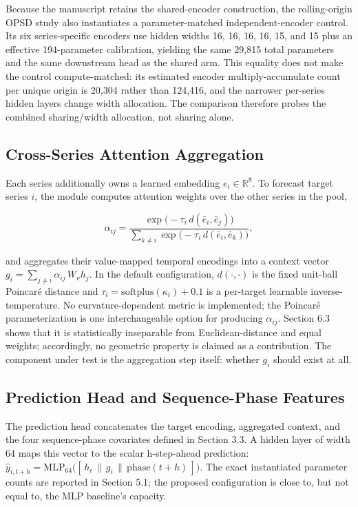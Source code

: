 \documentclass[electronics,article,submit,moreauthors]{Definitions/mdpi}
\begin{document}
Because the manuscript retains the shared-encoder construction, the rolling-origin OPSD study also instantiates a parameter-matched independent-encoder control. Its six series-specific encoders use hidden widths 16, 16, 16, 16, 15, and 15 plus an effective 194-parameter calibration, yielding the same 29,815 total parameters and the same downstream head as the shared arm. This equality does not make the control compute-matched: its estimated encoder multiply-accumulate count per unique origin is 20,304 rather than 124,416, and the narrower per-series hidden layers change width allocation. The comparison therefore probes the combined sharing/width allocation, not sharing alone.

\subsection{Cross-Series Attention Aggregation}\label{cross-series-attention-aggregation}

Each series additionally owns a learned embedding \(e_i \in \mathbb{R}^{8}\). To forecast target series \(i\), the module computes attention weights over the other series in the pool,

\[
\alpha_{ij} = \frac{\exp\!\big(-\tau_i \, d(\bar e_i, \bar e_j)\big)}{\sum_{k \neq i} \exp\!\big(-\tau_i \, d(\bar e_i, \bar e_k)\big)},
\]

and aggregates their value-mapped temporal encodings into a context vector \(g_i = \sum_{j \neq i} \alpha_{ij} \, W_v h_j\). In the default configuration, \(d(\cdot,\cdot)\) is the fixed unit-ball Poincar\'{e} distance and \(\tau_i = \mathrm{softplus}(\kappa_i) + 0.1\) is a per-target learnable inverse-temperature. No curvature-dependent metric is implemented; the Poincar\'{e} parameterization is one interchangeable option for producing \(\alpha_{ij}\). Section 6.3 shows that it is statistically inseparable from Euclidean-distance and equal weights; accordingly, no geometric property is claimed as a contribution. The component under test is the aggregation step itself: whether \(g_i\) should exist at all.

\subsection{Prediction Head and Sequence-Phase Features}\label{prediction-head-and-sequence-phase-features}

The prediction head concatenates the target encoding, aggregated context, and the four sequence-phase covariates defined in Section 3.3. A hidden layer of width 64 maps this vector to the scalar h-step-ahead prediction: \(\hat{y}_{i,t+h} = \mathrm{MLP}_{64}\big([\,h_i \,\|\, g_i \,\|\, \mathrm{phase}(t+h)\,]\big)\). The exact instantiated parameter counts are reported in Section 5.1; the proposed configuration is close to, but not equal to, the MLP baseline's capacity.
\end{document}
